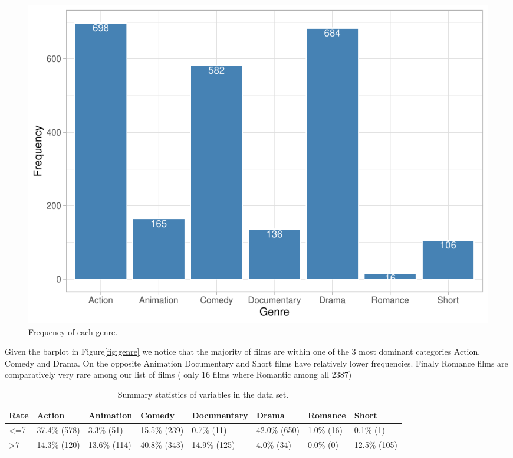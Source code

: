 \documentclass[
]{article}
\begin{document}
\begin{figure}[H]

{\centering \includegraphics[width=0.68\linewidth]{Group_07_Analysis_files/figure-latex/genre -1} 

}

\caption{\label{fig:genre} Frequency of each genre.}\label{fig:genre }
\end{figure}

Given the barplot in Figure\ref{fig:genre} we notice that the majority
of films are within one of the 3 most dominant categories Action, Comedy
and Drama. On the opposite Animation Documentary and Short films have
relatively lower frequencies. Finaly Romance films are comparatively
very rare among our list of films ( only 16 films where Romantic among
all 2387)

\begin{table}[!h]

\caption{\label{tab:unnamed-chunk-1}\label{tab:summary}Summary statistics of variables in the data set.}
\centering
\fontsize{10}{12}\selectfont
\begin{tabular}[t]{llllllll}
\toprule
Rate & Action & Animation & Comedy & Documentary & Drama & Romance & Short\\
\midrule
<=7 & 37.4\% (578) & 3.3\%  (51) & 15.5\% (239) & 0.7\%  (11) & 42.0\% (650) & 1.0\% (16) & 0.1\%   (1)\\
>7 & 14.3\% (120) & 13.6\% (114) & 40.8\% (343) & 14.9\% (125) & 4.0\%  (34) & 0.0\%  (0) & 12.5\% (105)\\
\bottomrule
\end{tabular}
\end{table}
\end{document}

